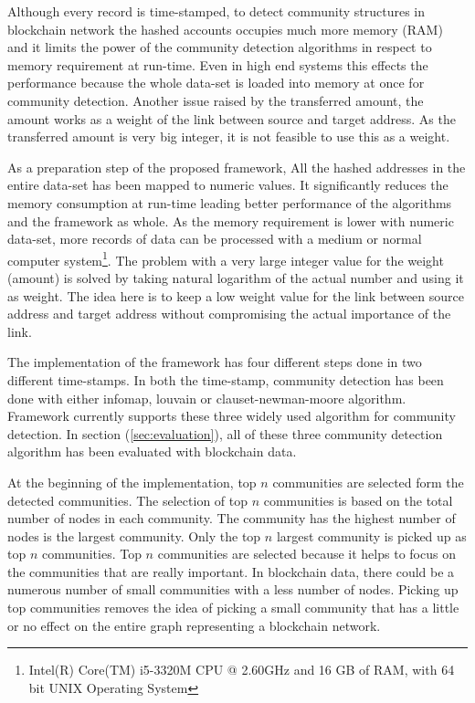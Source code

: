 Although every record is time-stamped, to detect community structures in blockchain network the hashed accounts occupies much more memory (RAM) and it limits the power of the community detection algorithms in respect to memory requirement at run-time. Even in high end systems this effects the performance because the whole data-set is loaded into memory at once for community detection. Another issue raised by the transferred amount, the amount works as a weight of the link between source and target address. As the transferred amount is very big integer, it is not feasible to use this as a weight. 

As a preparation step of the proposed framework, All the hashed addresses in the entire data-set has been mapped to numeric values. It significantly reduces the memory consumption at run-time leading better performance of the algorithms and the framework as whole. As the memory requirement is lower with numeric data-set, more records of data can be processed with a medium or normal computer system\footnote{Intel(R) Core(TM) i5-3320M CPU @ 2.60GHz and 16 GB of RAM, with 64 bit UNIX Operating System}.  The problem with a very large integer value for the weight (amount) is solved by taking natural logarithm of the actual number and using it as weight. The idea here is to keep a low weight value for the link between source address and target address without compromising the actual importance of the link.

The implementation of the framework has four different steps done in two different time-stamps. In both the time-stamp, community detection has been done with either infomap, louvain or clauset-newman-moore algorithm. Framework currently supports these three widely used algorithm for community detection. In section (\ref{sec:evaluation}), all of these three community detection algorithm has been evaluated with blockchain data.

At the beginning of the implementation, top $n$ communities are selected form the detected communities. The selection of top $n$ communities is based on the total number of nodes in each community. The community has the highest number of nodes is the largest community. Only the top $n$ largest community is picked up as top $n$ communities. Top $n$ communities are selected because it helps to focus on the communities that are really important. In blockchain data, there could be a numerous number of small communities with a less number of nodes. Picking up top communities removes the idea of picking a small community that has a little or no effect on the entire graph representing a blockchain network.

